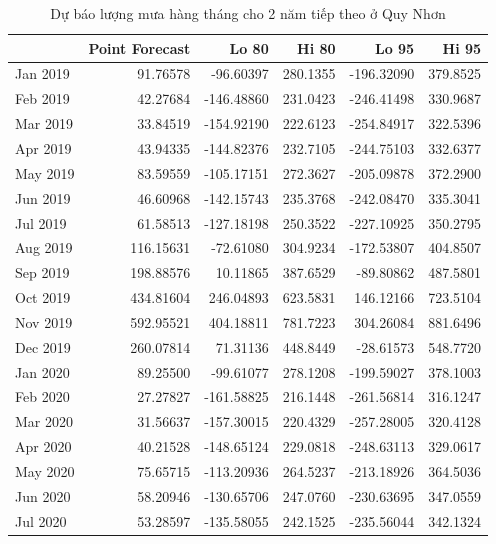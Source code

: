 \documentclass[12pt, a4paper,oneside]{book}
\theoremstyle{definition}
\begin{document}
\begin{table}[!h]
	\caption{Dự báo lượng mưa hàng tháng cho 2 năm tiếp theo ở Quy Nhơn}
	\label{kqrainfall}
	\centering
	\fontsize{6}{8}\selectfont
	\begin{tabular}[t]{lrrrrr}
		\toprule
		& Point Forecast & Lo 80 & Hi 80 & Lo 95 & Hi 95\\
		\midrule
		\rowcolor{gray!6}  Jan 2019 & 91.76578 & -96.60397 & 280.1355 & -196.32090 & 379.8525\\
		Feb 2019 & 42.27684 & -146.48860 & 231.0423 & -246.41498 & 330.9687\\
		\rowcolor{gray!6}  Mar 2019 & 33.84519 & -154.92190 & 222.6123 & -254.84917 & 322.5396\\
		Apr 2019 & 43.94335 & -144.82376 & 232.7105 & -244.75103 & 332.6377\\
		\rowcolor{gray!6}  May 2019 & 83.59559 & -105.17151 & 272.3627 & -205.09878 & 372.2900\\
		\addlinespace
		Jun 2019 & 46.60968 & -142.15743 & 235.3768 & -242.08470 & 335.3041\\
		\rowcolor{gray!6}  Jul 2019 & 61.58513 & -127.18198 & 250.3522 & -227.10925 & 350.2795\\
		Aug 2019 & 116.15631 & -72.61080 & 304.9234 & -172.53807 & 404.8507\\
		\rowcolor{gray!6}  Sep 2019 & 198.88576 & 10.11865 & 387.6529 & -89.80862 & 487.5801\\
		Oct 2019 & 434.81604 & 246.04893 & 623.5831 & 146.12166 & 723.5104\\
		\addlinespace 
		\rowcolor{gray!6}  Nov 2019 & 592.95521 & 404.18811 & 781.7223 & 304.26084 & 881.6496\\
		Dec 2019 & 260.07814 & 71.31136 & 448.8449 & -28.61573 & 548.7720\\
		\rowcolor{gray!6}  Jan 2020 & 89.25500 & -99.61077 & 278.1208 & -199.59027 & 378.1003\\
		Feb 2020 & 27.27827 & -161.58825 & 216.1448 & -261.56814 & 316.1247\\
		\rowcolor{gray!6}  Mar 2020 & 31.56637 & -157.30015 & 220.4329 & -257.28005 & 320.4128\\
		\addlinespace
		Apr 2020 & 40.21528 & -148.65124 & 229.0818 & -248.63113 & 329.0617\\
		\rowcolor{gray!6}  May 2020 & 75.65715 & -113.20936 & 264.5237 & -213.18926 & 364.5036\\
		Jun 2020 & 58.20946 & -130.65706 & 247.0760 & -230.63695 & 347.0559\\
		\rowcolor{gray!6}  Jul 2020 & 53.28597 & -135.58055 & 242.1525 & -235.56044 & 342.1324\\

\end{tabular}
\end{table}
\end{document}
